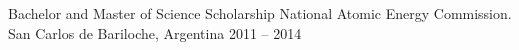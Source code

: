

\begin{cvhonors}

  \cvhonor
  	{Bachelor and Master of Science Scholarship}
  	{National Atomic Energy Commission.}
  	{San Carlos de Bariloche, Argentina}
  	{2011 -- 2014}

\end{cvhonors}
